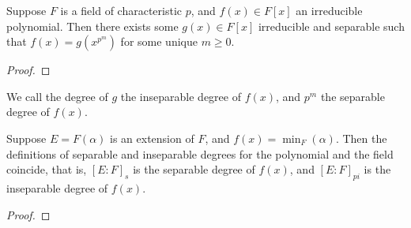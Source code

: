 \begin{proposition}\label{prop:separable-power-polynomial}
    Suppose \(F\) is a field of characteristic \(p\),
    and \(f(x) \in F[x]\) an irreducible polynomial.
    Then there exists some \(g(x) \in F[x]\) irreducible and separable
    such that \(f(x) = g(x^{p^m})\) for some unique \(m \geq 0\).
\end{proposition}
\begin{proof}
\end{proof}
\begin{definition}
    We call the degree of \(g\) the inseparable degree of \(f(x)\),
    and \(p^m\) the separable degree of \(f(x)\).
\end{definition}
\begin{proposition}
    Suppose \(E = F(\alpha)\) is an extension of \(F\),
    and \(f(x) = \min_F(\alpha)\).
    Then the definitions of separable and inseparable degrees
    for the polynomial and the field coincide,
    that is, \({[E:F]}_s\) is the separable degree of \(f(x)\),
    and \({[E:F]}_{pi}\) is the inseparable degree of \(f(x)\).
\end{proposition}
\begin{proof}
\end{proof}

